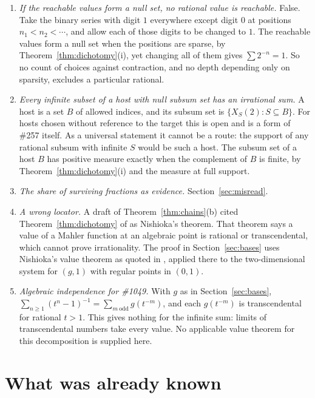 \documentclass[11pt]{article}
\begin{document}
\begin{enumerate}
\item \emph{If the reachable values form a null set, no rational value is
  reachable.}  False.  Take the binary series with digit $1$ everywhere except
  digit $0$ at positions $n_1<n_2<\cdots$, and allow each of those digits to be
  changed to $1$.  The reachable values form a null set when the positions are
  sparse, by Theorem~\ref{thm:dichotomy}(i), yet changing all of them gives $\sum2^{-n}=1$.
  So no count of choices against contraction, and no depth depending only on
  sparsity, excludes a particular rational.
\item \emph{Every infinite subset of a host with null subsum set has an
  irrational sum.}  A host is a set $B$ of allowed indices, and its subsum set
  is $\{X_S(2):S\subseteq B\}$.  For hosts chosen without reference to the target this is
  open and is a form of \#257 itself.  As a universal statement it cannot be a
  route: the support of any rational subsum with infinite $S$ would be such a
  host.  The subsum set of a host $B$ has positive measure exactly when the
  complement of $B$ is finite, by Theorem~\ref{thm:dichotomy}(i) and the measure at full
  support.
\item \emph{The share of surviving fractions as evidence.}  Section~\ref{sec:misread}.
\item \emph{A wrong locator.}  A draft of Theorem~\ref{thm:chains}(b) cited Theorem~\ref{thm:dichotomy} of
  \cite{adamczewskifaverjon2026} as Nishioka's theorem.  That theorem says a
  value of a Mahler function at an algebraic point is rational or
  transcendental, which cannot prove irrationality.  The proof in Section~\ref{sec:bases} uses
  Nishioka's value theorem as quoted in
  \cite[Theorem~1.1, p.~3]{adamczewskifaverjon2016}, applied there to the
  two-dimensional system for $(g,1)$ with regular points in $(0,1)$.
\item \emph{Algebraic independence for \#1049.}  With $g$ as in Section~\ref{sec:bases},
  $\sum_{n\ge1}(t^n-1)^{-1}=\sum_{m\ \mathrm{odd}}g(t^{-m})$, and each $g(t^{-m})$
  is transcendental for rational $t>1$.  This gives nothing for the infinite
  sum: limits of transcendental numbers take every value.  No applicable
  value theorem for this decomposition is supplied here.
\end{enumerate}

\section{What was already known}\label{sec:known}
\end{document}
